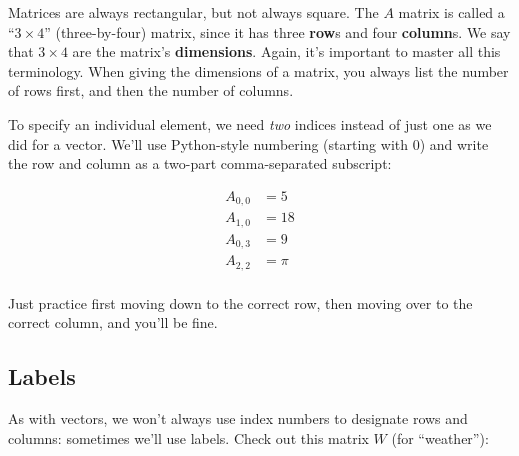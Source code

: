 Matrices are always rectangular, but not always square. The $A$ matrix is
called a ``$3\times 4$'' (three-by-four) matrix, since it has three
\textbf{row}s and four \textbf{column}s. We say that $3\times 4$ are the
matrix's \textbf{dimensions}. Again, it's important to master all this
terminology. When giving the dimensions of a matrix, you always list the number
of rows first, and then the number of columns.


To specify an individual element, we need \textit{two} indices instead of just
one as we did for a vector. We'll use Python-style numbering (starting with 0)
and write the row and column as a two-part comma-separated subscript:

\vspace{-.15in}
\begin{align*}
A_{0,0} &= 5 \\
A_{1,0} &= 18 \\
A_{0,3} &= 9 \\
A_{2,2} &= \pi \\
\end{align*}
\vspace{-.25in}

Just practice first moving down to the correct row, then moving over to the
correct column, and you'll be fine.

\subsection{Labels}


As with vectors, we won't always use index numbers to designate rows and
columns: sometimes we'll use labels. Check out this matrix $W$ (for
``weather''):


